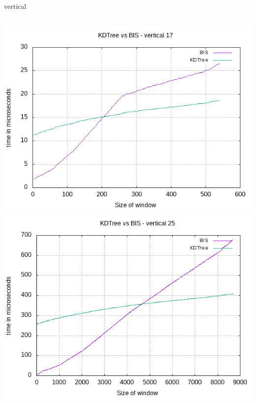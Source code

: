 \documentclass[pdf]{beamer}
\begin{document}
\begin{frame}{vertical}
  \begin{columns}
    \includegraphics[scale=0.35]{pictures/analysis/vert_17.png}
    \includegraphics[scale=0.35]{pictures/analysis/vert_25.png}
  \end{columns}
\end{frame}
\end{document}
